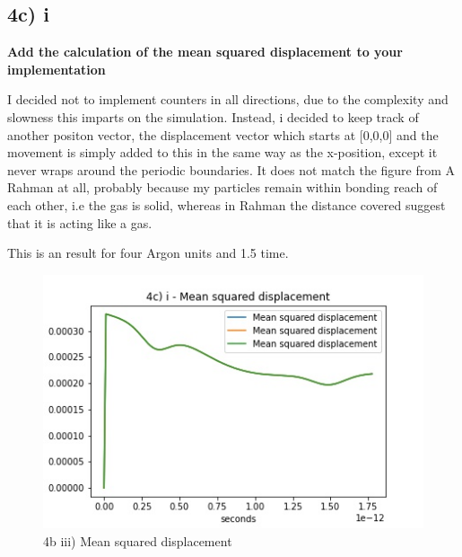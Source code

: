 \documentclass[a4paper,10pt,english]{article}
\begin{document}
\newpage
\subsection{4c) i}
\textbf{Add the calculation of the mean squared displacement to your implementation}

I decided not to implement counters in all directions, due to the complexity and slowness this imparts on the simulation. Instead, i decided to keep track of another positon vector, the displacement vector which starts at [0,0,0] and the movement is simply added to this in the same way as the x-position, except it never wraps around the periodic boundaries. It does not match the figure from A Rahman at all, probably because my particles remain within bonding reach of each other, i.e the gas is solid, whereas in Rahman the distance covered suggest that it is acting like a gas.

This is an result for four Argon units and 1.5 time.
\begin{figure}[h!]
        \centering 
        \includegraphics[scale=0.6]{./py/4c_i.jpg} 
        \caption{4b iii) Mean squared displacement}
        \label{fig:4bv}
\end{figure}
\end{document}

